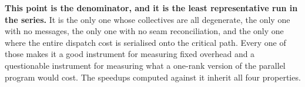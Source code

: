 \documentclass[11pt]{article}
\begin{document}
\textbf{This point is the denominator, and it is the least representative run in the series.} It
is the only one whose collectives are all degenerate, the only one with no messages, the only one
with no seam reconciliation, and the only one where the entire dispatch cost is serialised onto
the critical path. Every one of those makes it a good instrument for measuring fixed overhead and
a questionable instrument for measuring what a one-rank version of the parallel program would
cost. The speedups computed against it inherit all four properties.
\end{document}
